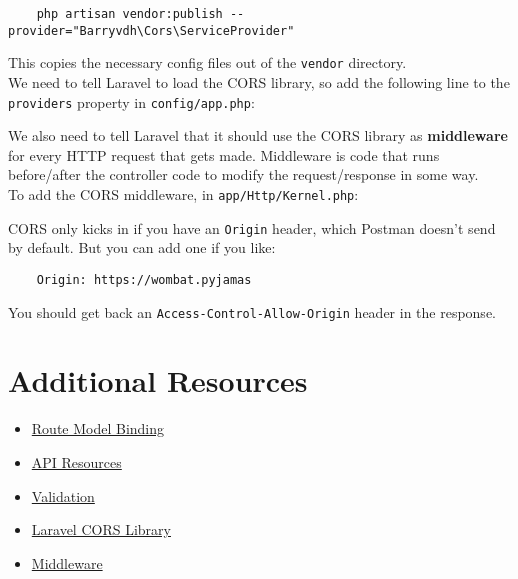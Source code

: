 \begin{verbatim}
    php artisan vendor:publish --provider="Barryvdh\Cors\ServiceProvider"
\end{verbatim}

This copies the necessary config files out of the \texttt{vendor} directory.
\\

We need to tell Laravel to load the CORS library, so add the following line to the \texttt{providers} property in \texttt{config/app.php}:


We also need to tell Laravel that it should use the CORS library as \textbf{middleware} for every HTTP request that gets made. Middleware is code that runs before/after the controller code to modify the request/response in some way.
\\

To add the CORS middleware, in \texttt{app/Http/Kernel.php}:


CORS only kicks in if you have an \texttt{Origin} header, which Postman doesn't send by default. But you can add one if you like:

\begin{verbatim}
    Origin: https://wombat.pyjamas
\end{verbatim}

You should get back an \texttt{Access-Control-Allow-Origin} header in the response.



\section{Additional Resources}

\begin{itemize}[leftmargin=*]
    \item \href{https://laravel.com/docs/master/routing#route-model-binding}{Route Model Binding}
    \item \href{https://laravel.com/docs/master/eloquent-resources}{API Resources}
    \item \href{http://laravel.com/docs/master/validation}{Validation}
    \item \href{https://github.com/barryvdh/laravel-cors}{Laravel CORS Library}
    \item \href{http://laravel.com/docs/master/middleware}{Middleware}
\end{itemize}
